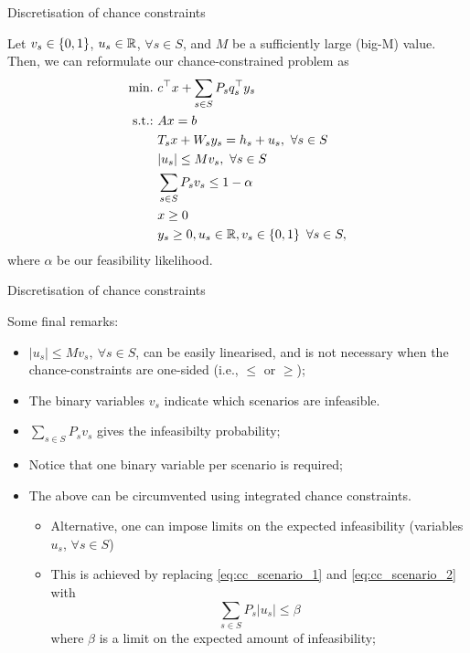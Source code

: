 \begin{frame}{Discretisation of chance constraints}

	Let $v_s \in \left\{ 0,1 \right \}$, $u_s \in \mathbb R$, $\forall s \in S$, and $M$ be a sufficiently large (big-M) value. \pause Then, we can reformulate our chance-constrained problem as
	\begin{subequations} 
		\begin{align}
			\mathop{\text{min.} \ }  & c^\top x + \sum_{s\in S} P_s q_s^\top y_s \\
			\mathop{\text{s.t.:} \ }	   & Ax = b \\
				   & T_sx + W_s y_s = h_s + u_s, \ \forall s \in S \\
				   & |u_s| \le Mv_s, \ \forall s \in S  \label{eq:cc_scenario_1}\\ 
				   & \sum_{s \in S} P_s v_s \le 1-\alpha \label{eq:cc_scenario_2} \\
				   & x \ge 0 \\
				   & y_s \ge 0, u_s \in \mathbb R, v_s \in \left\{ 0,1 \right \}  \ \forall s \in S,
		\end{align}
	\end{subequations}
	where $\alpha$ be our \alert{feasibility likelihood}. 
	
\end{frame}


\begin{frame}{Discretisation of chance constraints}

	Some final remarks:
	\vspace{-6pt}
	\begin{itemize}[<+->]
		\item $|u_s| \le Mv_s, \ \forall s \in S$, can be easily linearised, and is not necessary when the chance-constraints are one-sided (i.e., $\le$ or $\ge$);
		\item The binary variables $v_s$ indicate which scenarios are \alert{infeasible}.
		\item $\sum_{s \in S} P_s v_s$ gives the \alert{infeasibilty probability};
		\item Notice that one \alert{binary variable} per scenario is required;
		\item The above can be circumvented using \alert{integrated chance constraints}. 
		\begin{itemize}
			\item Alternative, one can impose limits on the \alert{expected infeasibility} (variables $u_s$, $\forall s \in S$)
			\item This is achieved by replacing \eqref{eq:cc_scenario_1} and \eqref{eq:cc_scenario_2} with
			   \begin{equation*}
				   \sum_{s \in S} P_s |u_s| \le \beta
			   \end{equation*}
			   where $\beta$ is a limit on the expected amount of infeasibility;	   
		\end{itemize}
	\end{itemize}
	
\end{frame}



